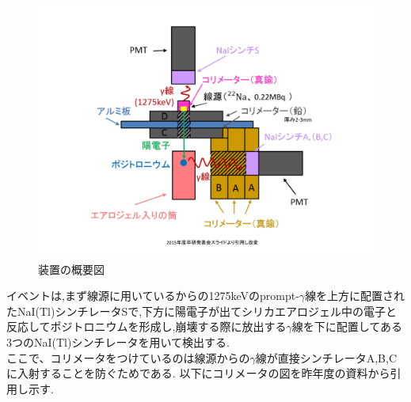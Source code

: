 \begin{figure}[H]
	\begin{center}
		\includegraphics[width=15cm]{fig/isb/settings.pdf}
		\caption{装置の概要図}
		\label{fig:setting_dtl2015}
	\end{center}
\end{figure}

イベントは,まず線源に用いているからの1275keVのprompt-$\gamma$線を上方に配置されたNaI(Tl)シンチレータSで,下方に陽電子が出てシリカエアロジェル中の電子と反応してポジトロニウムを形成し,崩壊する際に放出する$\gamma$線を下に配置してある3つのNaI(Tl)シンチレータを用いて検出する.\\
ここで、コリメータをつけているのは線源からの$\gamma$線が直接シンチレータA,B,Cに入射することを防ぐためである.
以下にコリメータの図を昨年度の資料から引用し示す.
